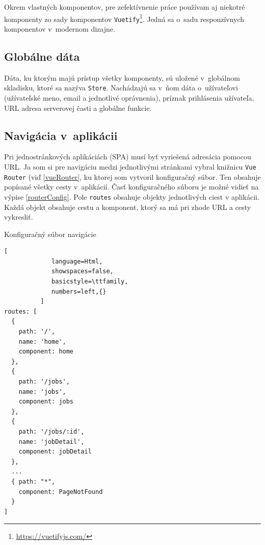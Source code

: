 \documentclass[slovak]{fitthesis}
\begin{document}
\noindent
Okrem vlastných komponentov, pre zefektívnenie práce používam aj niekotré komponenty zo sady komponentov \texttt{Vuetify}\footnote{\url{https://vuetifyjs.com/}}. Jedná sa o~sadu responzívnych komponentov v~modernom dizajne.

\subsection{Globálne dáta}
Dáta, ku ktorým majú prístup všetky komponenty, sú uložené v~globálnom skladisku, ktoré sa nazýva \texttt{Store}. Nachádzajú sa v~ňom dáta o~užívateľovi (užívateľské meno, email a jednotlivé oprávnenia), príznak prihlásenia užívateľa, URL adresa serverovej časti a globálne funkcie.

\subsection{Navigácia v~aplikácii}
Pri jednostránkových aplikáciách (SPA) musí byť vyriešená adresácia pomocou URL. Ja som si pre navigáciu medzi jednotlivými stránkami vybral knižnicu \texttt{Vue Router} (viď \ref{vueRouter}, ku ktorej som vytvoril konfiguračný súbor. Ten obsahuje popísané všetky cesty v~aplikácií. Časť konfiguračného súboru je možné vidieť na výpise \ref{routerConfig}. Pole \texttt{routes} obsahuje objekty jednotlivých ciest v aplikácii. Každá objekt obsahuje cestu a komponent, ktorý sa má pri zhode URL a cesty vykresliť.

\begin{algorithm}[H]
  \caption{Konfiguračný súbor navigácie}
  \label{routerConfig}
  \begin{lstlisting}[
             language=Html,
             showspaces=false,
             basicstyle=\ttfamily,
             numbers=left,{}
          ]
routes: [
  {
    path: '/',
    name: 'home',
    component: home
  },
  {
    path: '/jobs',
    name: 'jobs',
    component: jobs
  },
  {
    path: '/jobs/:id',
    name: 'jobDetail',
    component: jobDetail
  },
  ...
  { path: "*",
    component: PageNotFound
  }
]
  \end{lstlisting}
\end{algorithm}
\end{document}
